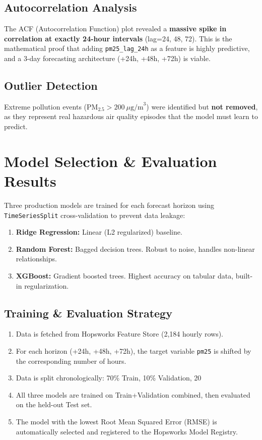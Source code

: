 \documentclass[11pt,a4paper]{article}
\begin{document}
\subsection{Autocorrelation Analysis}
The ACF (Autocorrelation Function) plot revealed a \textbf{massive spike in correlation at exactly 24-hour intervals} (lag=24, 48, 72). This is the mathematical proof that adding \texttt{pm25\_lag\_24h} as a feature is highly predictive, and a 3-day forecasting architecture (+24h, +48h, +72h) is viable.

\subsection{Outlier Detection}
Extreme pollution events ($\text{PM}_{2.5} > 200\ \mu\text{g/m}^3$) were identified but \textbf{not removed}, as they represent real hazardous air quality episodes that the model must learn to predict.

\newpage
\section{Model Selection \& Evaluation Results}

Three production models are trained for each forecast horizon using \texttt{TimeSeriesSplit} cross-validation to prevent data leakage:

\begin{enumerate}
    \item \textbf{Ridge Regression:} Linear (L2 regularized) baseline.
    \item \textbf{Random Forest:} Bagged decision trees. Robust to noise, handles non-linear relationships.
    \item \textbf{XGBoost:} Gradient boosted trees. Highest accuracy on tabular data, built-in regularization.
\end{enumerate}

\subsection{Training \& Evaluation Strategy}
\begin{enumerate}
    \item Data is fetched from Hopsworks Feature Store (2,184 hourly rows).
    \item For each horizon (+24h, +48h, +72h), the target variable \texttt{pm25} is shifted by the corresponding number of hours.
    \item Data is split chronologically: 70\% Train, 10\% Validation, 20%
    \item All three models are trained on Train+Validation combined, then evaluated on the held-out Test set.
    \item The model with the lowest Root Mean Squared Error (RMSE) is automatically selected and registered to the Hopsworks Model Registry.
\end{enumerate}
\end{document}

